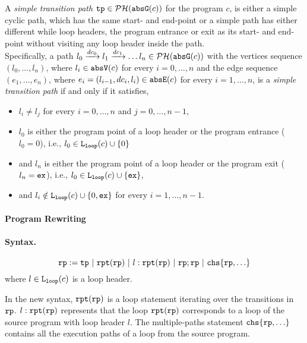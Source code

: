 \begin{defn}
  \label{def:tpath}
A \emph{simple transition path}
$\mathtt{tp} \in \mathcal{PH}(\mathtt{abs}{\mathtt{G}}(c))$ for the program $c$, is either a simple cyclic path, which has the same start- and end-point
or a simple path has either different while loop headers, the program entrance or exit as its start- and end-point
without visiting any loop header inside the path.
\\
Specifically, a path $l_0 \xrightarrow{dc_0} l_1 \xrightarrow{dc_1} \ldots l_n \in \mathcal{PH}(\mathtt{abs}{\mathtt{G}}(c))$ with the
vertices sequence $(l_0, \ldots, l_n)$, where $l_i \in \mathtt{abs}{\mathtt{V}}(c)$ for every $i = 0, \ldots, n$ and
%
the edge sequence $(e_1, \ldots, e_n)$, where $e_i = (l_{i - 1}, dc_i, l_{i}) \in \mathtt{abs}{\mathtt{E}}(c)$ for every $i = 1, \ldots, n$,
%
is a \emph{simple transition path} if and only if it satisfies,
\begin{itemize}
  \item $l_i \neq l_j$ for every $i = 0, \ldots, n$ and $j = 0, \ldots, {n - 1}$,
  \item $l_0$ is either the program point of a loop header or the program entrance ($l_0 = 0$),
  i.e., $l_0 \in \mathtt{L}_{\mathtt{loop}}(c) \cup \{ 0 \}$
  \item and $l_n$ is either the program point of a loop header or the program exit ($l_n = \mathtt{ex}$),
  i.e., $l_0 \in \mathtt{L}_{\mathtt{loop}}(c) \cup \{ \mathtt{ex} \}$,
  \item and $l_i \notin \mathtt{L}_{\mathtt{loop}}(c) \cup \{ 0, \mathtt{ex} \}$ for every $i = 1, \ldots, n-1$.
\end{itemize}
\end{defn}

\paragraph{Program Rewriting}
\paragraph{Syntax.}

\[
    \rprog := \tpath ~|~ \rprepeat(\rprog) ~|~ l : \rprepeat(\rprog) ~|~ \rprog;\rprog ~|~ \rpchoose{\rprog, \ldots} 
\]
where $l\in \mathtt{L}_{\mathtt{loop}}(c)$ is a loop header.

In the new syntax, $\mathtt{rpt}(\mathtt{rp})$ is a loop statement iterating over the transitions in $\mathtt{rp}$.
$l: \mathtt{rpt}(\mathtt{rp})$ represents that the loop $ \mathtt{rpt}(\mathtt{rp})$
corresponds to a loop of the source program with loop header $l$.
The multiple-paths statement $\rpchoose{\rprog, \ldots} $ contains all the execution paths of a loop from the source program.


